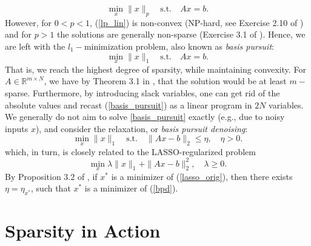 \documentclass[11pt, twoside]{report}
\begin{document}
\begin{equation} \label{lp_lin}
    \min_x \|x\|_p \quad \text{s.t.} \quad Ax=b.
\end{equation}
However, for $0<p<1$, (\ref{lp_lin}) is non-convex (NP-hard, see Exercise 2.10 of \cite{anha}) and for $p>1$ the solutions are generally non-sparse (Exercise 3.1 of \cite{anha}). Hence, we are left with the $l_1-$minimization problem, also known as \textit{basis pursuit}:
\begin{equation} \label{basis_pursuit}
    \min_x \|x\|_1 \quad \text{s.t.} \quad Ax=b.
\end{equation}
That is, we reach the highest degree of sparsity, while maintaining convexity. For $A \in \mathbb{R}^{m \times N}$, we have by Theorem 3.1 in \cite{anha}, that the solution would be at least $m-$sparse. Furthermore, by introducing slack variables, one can get rid of the absolute values and recast (\ref{basis_pursuit}) as a linear program in $2N$ variables. We generally do not aim to solve \ref{basis_pursuit} exactly (e.g., due to noisy inputs $x$), and consider the relaxation, or \textit{basis pursuit denoising}:
\begin{equation} \label{bpd}
    \min_x \|x\|_1 \quad \text{s.t.} \quad \|Ax-b\|_2 \leq \eta, \quad \eta>0.
\end{equation}
which, in turn, is closely related to the LASSO-regularized problem
\begin{equation} \label{lasso_orig}
    \min_x \lambda\|x\|_1 + \|Ax-b\|_2^2, \quad \lambda \geq 0.
\end{equation}
By Proposition 3.2 of \cite{anha}, if $x^*$ is a minimizer of (\ref{lasso_orig}), then there exists $\eta = \eta_{x^*}$, such that $x^*$ is a minimizer of (\ref{bpd}).

\section{Sparsity in Action}
\end{document}
